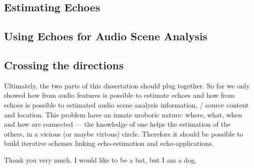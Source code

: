 \subsection{Estimating Echoes}

\subsection{Using Echoes for Audio Scene Analysis}


\subsection{Crossing the directions}
Ultimately, the two parts of this dissertation should plug together.
So far we only showed how from audio features is possible to estimate echoes and how from echoes is possible to estimated audio scene analysis information, \eg/ source content and location.
This problem have an innate uroboric nature: where, what, when and how are connected --- the knowledge of one helps the estimation of the others, in a vicious (or maybe virtous) circle.
Therefore it should be possible to build iterative schemes linking echo-estimation and echo-applications.

\mynewline
Thank you very much. I would like to be a bat, but I am a dog.